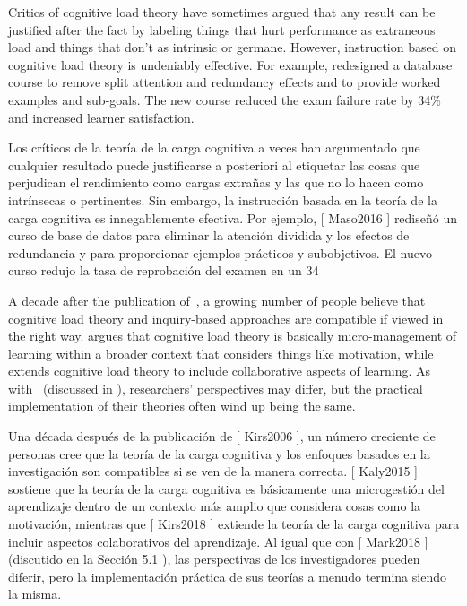 Critics of cognitive load theory have sometimes argued that
any result can be justified after the fact by labeling things that hurt performance as extraneous load
and things that don't as intrinsic or germane.
However,
instruction based on cognitive load theory is undeniably effective.
For example,
\cite{Maso2016} redesigned a database course to remove split attention and redundancy effects
and to provide worked examples and sub-goals.
The new course reduced the exam failure rate by 34\%
and increased learner satisfaction.

Los críticos de la teoría de la carga cognitiva a veces han argumentado que cualquier resultado puede justificarse a posteriori al etiquetar las cosas que perjudican el rendimiento como cargas extrañas y las que no lo hacen como intrínsecas o pertinentes. Sin embargo, la instrucción basada en la teoría de la carga cognitiva es innegablemente efectiva. Por ejemplo, [ Maso2016 ] rediseñó un curso de base de datos para eliminar la atención dividida y los efectos de redundancia y para proporcionar ejemplos prácticos y subobjetivos. El nuevo curso redujo la tasa de reprobación del examen en un 34%


A decade after the publication of~\cite{Kirs2006},
a growing number of people believe that cognitive load theory and inquiry-based approaches are compatible
if viewed in the right way.
\cite{Kaly2015} argues that cognitive load theory is basically micro-management of learning
within a broader context that considers things like motivation,
while~\cite{Kirs2018} extends cognitive load theory to include collaborative aspects of learning.
As with~\cite{Mark2018} (discussed in ),
researchers' perspectives may differ,
but the practical implementation of their theories often wind up being the same.

Una década después de la publicación de [ Kirs2006 ], un número creciente de personas cree que la teoría de la carga cognitiva y los enfoques basados ​​en la investigación son compatibles si se ven de la manera correcta. [ Kaly2015 ] sostiene que la teoría de la carga cognitiva es básicamente una microgestión del aprendizaje dentro de un contexto más amplio que considera cosas como la motivación, mientras que [ Kirs2018 ] extiende la teoría de la carga cognitiva para incluir aspectos colaborativos del aprendizaje. Al igual que con [ Mark2018 ] (discutido en la Sección  5.1 ), las perspectivas de los investigadores pueden diferir, pero la implementación práctica de sus teorías a menudo termina siendo la misma.


